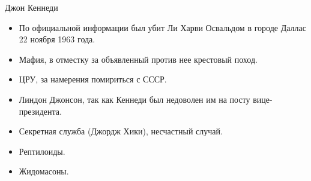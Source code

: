\documentclass{beamer}
\begin{document}
\begin{frame}{Джон Кеннеди}
\begin{itemize}
\item По официальной информации был убит Ли Харви Освальдом в городе Даллас 22 ноября 1963 года.
\item Мафия, в отместку за объявленный против нее крестовый поход.
\item ЦРУ, за намерения помириться с СССР.
\item Линдон Джонсон, так как Кеннеди был недоволен им на посту вице-президента.
\item Секретная служба (Джордж Хики), несчастный случай.
\item Рептилоиды.
\item Жидомасоны.
\end{itemize}
\end{frame}
\end{document}
